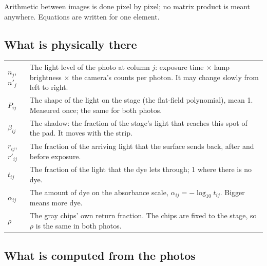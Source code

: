 \documentclass[11pt,letter]{article}
\newcommand{\Lten}{\log_{10}}
\begin{document}
\medskip
\noindent Arithmetic between images is done pixel by pixel; no matrix
product is meant anywhere.  Equations are written for one element.

\subsection*{What is physically there}

\begin{tabular}{@{}L{2.4cm}L{12.4cm}@{}}
\toprule
$n_j$, $n'_j$ & The light level of the photo at column $j$: exposure time
  $\times$ lamp brightness $\times$ the camera's counts per photon.  It may
  change slowly from left to right. \\
$P_{ij}$ & The shape of the light on the stage (the flat-field polynomial),
  mean 1.  Measured once; the same for both photos. \\
$\beta_{ij}$ & The shadow: the fraction of the stage's light that reaches this
  spot of the pad.  It moves with the strip. \\
$r_{ij}$, $r'_{ij}$ & The fraction of the arriving light that the surface
  sends back, after and before exposure. \\
$t_{ij}$ & The fraction of the light that the dye lets through; 1 where
  there is no dye. \\
$\alpha_{ij}$ & The amount of dye on the absorbance scale,
  $\alpha_{ij} = -\Lten t_{ij}$.  Bigger means more dye. \\
$\rho$ & The gray chips' own return fraction.  The chips are fixed to the
  stage, so $\rho$ is the same in both photos. \\
\bottomrule
\end{tabular}

\subsection*{What is computed from the photos}
\end{document}
